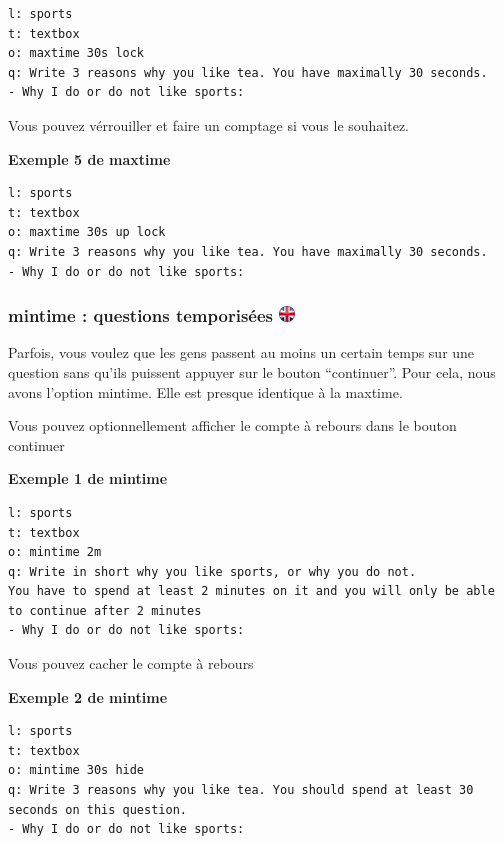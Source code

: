 \documentclass[
]{book}
\begin{document}
\begin{verbatim}
l: sports
t: textbox
o: maxtime 30s lock
q: Write 3 reasons why you like tea. You have maximally 30 seconds.
- Why I do or do not like sports:
\end{verbatim}

Vous pouvez vérrouiller et faire un comptage si vous le souhaitez.

\textbf{Exemple 5 de maxtime}

\begin{verbatim}
l: sports
t: textbox
o: maxtime 30s up lock
q: Write 3 reasons why you like tea. You have maximally 30 seconds.
- Why I do or do not like sports:
\end{verbatim}

\hypertarget{mintime-questions-temporisuxe9es}{%
\subsubsection[mintime : questions temporisées ]{\texorpdfstring{mintime
: questions temporisées
\href{https://www.psytoolkit.org/doc3.1.0/online-survey-syntax.html\#mintime}{\protect\includegraphics{img/ukflag.png}}}{mintime : questions temporisées }}\label{mintime-questions-temporisuxe9es}}

Parfois, vous voulez que les gens passent au moins un certain temps sur
une question sans qu'ils puissent appuyer sur le bouton ``continuer''.
Pour cela, nous avons l'option mintime. Elle est presque identique à la
maxtime.

Vous pouvez optionnellement afficher le compte à rebours dans le bouton
continuer

\textbf{Exemple 1 de mintime}

\begin{verbatim}
l: sports
t: textbox
o: mintime 2m
q: Write in short why you like sports, or why you do not.
You have to spend at least 2 minutes on it and you will only be able to continue after 2 minutes
- Why I do or do not like sports:
\end{verbatim}

Vous pouvez cacher le compte à rebours

\textbf{Exemple 2 de mintime}

\begin{verbatim}
l: sports
t: textbox
o: mintime 30s hide
q: Write 3 reasons why you like tea. You should spend at least 30 seconds on this question.
- Why I do or do not like sports:
\end{verbatim}
\end{document}
